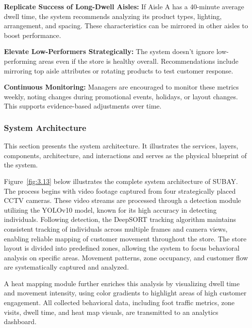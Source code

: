{\textbf{Replicate Success of Long-Dwell Aisles:} If Aisle A has a 40-minute average dwell time, the system recommends analyzing its product types, lighting, arrangement, and spacing. These characteristics can be mirrored in other aisles to boost performance.

\textbf{Elevate Low-Performers Strategically:} The system doesn’t ignore low-performing areas even if the store is healthy overall. Recommendations include mirroring top aisle attributes or rotating products to test customer response.

\textbf{Continuous Monitoring:} Managers are encouraged to monitor these metrics weekly, noting changes during promotional events, holidays, or layout changes. This supports evidence-based adjustments over time.

\subsubsection{System Architecture}
This section presents the system architecture. It illustrates the services, layers, components, architecture, and interactions and serves as the physical blueprint of the system.

Figure~\ref{fig:3.13} below illustrates the complete system architecture of SUBAY. The process begins with video footage captured from four strategically placed CCTV cameras. These video streams are processed through a detection module utilizing the YOLOv10 model, known for its high accuracy in detecting individuals. Following detection, the DeepSORT tracking algorithm maintains consistent tracking of individuals across multiple frames and camera views, enabling reliable mapping of customer movement throughout the store. The store layout is divided into predefined zones, allowing the system to focus behavioral analysis on specific areas. Movement patterns, zone occupancy, and customer flow are systematically captured and analyzed.

A heat mapping module further enriches this analysis by visualizing dwell time and movement intensity, using color gradients to highlight areas of high customer engagement. All collected behavioral data, including foot traffic metrics, zone visits, dwell time, and heat map visuals, are transmitted to an analytics dashboard. 

}
